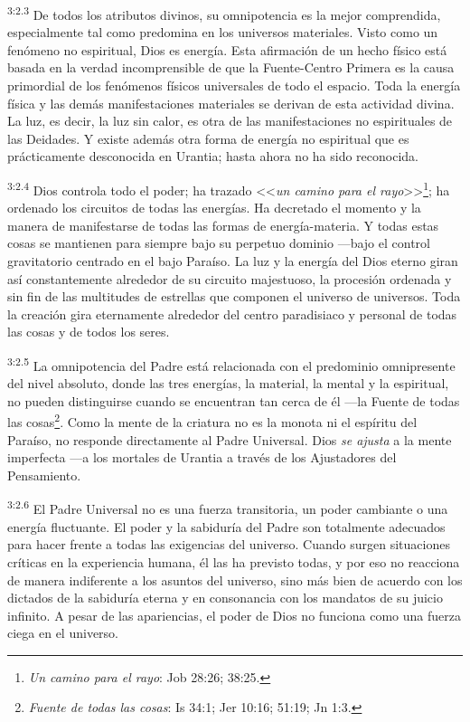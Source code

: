 \par
\textsuperscript{3:2.3} De todos los atributos divinos, su omnipotencia es la mejor comprendida, especialmente tal como predomina en los universos materiales. Visto como un fenómeno no espiritual, Dios es energía. Esta afirmación de un hecho físico está basada en la verdad incomprensible de que la Fuente-Centro Primera es la causa primordial de los fenómenos físicos universales de todo el espacio. Toda la energía física y las demás manifestaciones materiales se derivan de esta actividad divina. La luz, es decir, la luz sin calor, es otra de las manifestaciones no espirituales de las Deidades. Y existe además otra forma de energía no espiritual que es prácticamente desconocida en Urantia; hasta ahora no ha sido reconocida.

\par
\textsuperscript{3:2.4} Dios controla todo el poder; ha trazado <<\textit{un camino para el rayo}>>\footnote{\textit{Un camino para el rayo}: Job 28:26; 38:25.}; ha ordenado los circuitos de todas las energías. Ha decretado el momento y la manera de manifestarse de todas las formas de energía-materia. Y todas estas cosas se mantienen para siempre bajo su perpetuo dominio ---bajo el control gravitatorio centrado en el bajo Paraíso. La luz y la energía del Dios eterno giran así constantemente alrededor de su circuito majestuoso, la procesión ordenada y sin fin de las multitudes de estrellas que componen el universo de universos. Toda la creación gira eternamente alrededor del centro paradisiaco y personal de todas las cosas y de todos los seres.

\par
\textsuperscript{3:2.5} La omnipotencia del Padre está relacionada con el predominio omnipresente del nivel absoluto, donde las tres energías, la material, la mental y la espiritual, no pueden distinguirse cuando se encuentran tan cerca de él ---la Fuente de todas las cosas\footnote{\textit{Fuente de todas las cosas}: Is 34:1; Jer 10:16; 51:19; Jn 1:3.}. Como la mente de la criatura no es la monota ni el espíritu del Paraíso, no responde directamente al Padre Universal. Dios \textit{se ajusta} a la mente imperfecta ---a los mortales de Urantia a través de los Ajustadores del Pensamiento.

\par
\textsuperscript{3:2.6} El Padre Universal no es una fuerza transitoria, un poder cambiante o una energía fluctuante. El poder y la sabiduría del Padre son totalmente adecuados para hacer frente a todas las exigencias del universo. Cuando surgen situaciones críticas en la experiencia humana, él las ha previsto todas, y por eso no reacciona de manera indiferente a los asuntos del universo, sino más bien de acuerdo con los dictados de la sabiduría eterna y en consonancia con los mandatos de su juicio infinito. A pesar de las apariencias, el poder de Dios no funciona como una fuerza ciega en el universo.

